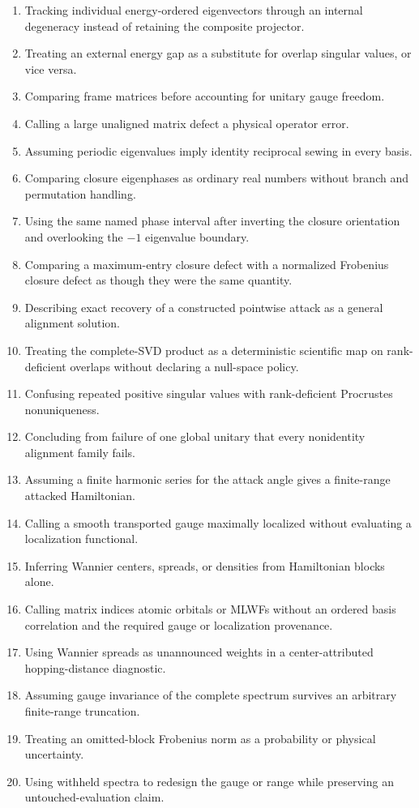 \begin{enumerate}
  \item Tracking individual energy-ordered eigenvectors through an internal
        degeneracy instead of retaining the composite projector.
  \item Treating an external energy gap as a substitute for overlap singular
        values, or vice versa.
  \item Comparing frame matrices before accounting for unitary gauge freedom.
  \item Calling a large unaligned matrix defect a physical operator error.
  \item Assuming periodic eigenvalues imply identity reciprocal sewing in every
        basis.
  \item Comparing closure eigenphases as ordinary real numbers without branch
        and permutation handling.
  \item Using the same named phase interval after inverting the closure
        orientation and overlooking the $-1$ eigenvalue boundary.
  \item Comparing a maximum-entry closure defect with a normalized Frobenius
        closure defect as though they were the same quantity.
  \item Describing exact recovery of a constructed pointwise attack as a
        general alignment solution.
  \item Treating the complete-SVD product as a deterministic scientific map on
        rank-deficient overlaps without declaring a null-space policy.
  \item Confusing repeated positive singular values with rank-deficient
        Procrustes nonuniqueness.
  \item Concluding from failure of one global unitary that every nonidentity
        alignment family fails.
  \item Assuming a finite harmonic series for the attack angle gives a
        finite-range attacked Hamiltonian.
  \item Calling a smooth transported gauge maximally localized without
        evaluating a localization functional.
  \item Inferring Wannier centers, spreads, or densities from Hamiltonian
        blocks alone.
  \item Calling matrix indices atomic orbitals or MLWFs without an ordered
        basis correlation and the required gauge or localization provenance.
  \item Using Wannier spreads as unannounced weights in a center-attributed
        hopping-distance diagnostic.
  \item Assuming gauge invariance of the complete spectrum survives an
        arbitrary finite-range truncation.
  \item Treating an omitted-block Frobenius norm as a probability or physical
        uncertainty.
  \item Using withheld spectra to redesign the gauge or range while preserving
        an untouched-evaluation claim.
\end{enumerate}

